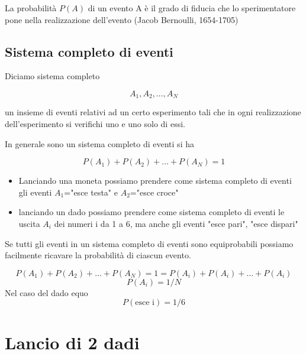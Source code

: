 \documentclass[onecolumn,12pt]{book}\usepackage[]{graphicx}\usepackage[]{color}
\begin{document}
 

La probabilità $P(A)$ di un evento A è il grado di fiducia  che lo sperimentatore pone nella realizzazione dell'evento (Jacob Bernoulli, 1654-1705) 

 
\subsection{Sistema completo di eventi}

Diciamo sistema completo

$$A_1, A_2,\ldots, A_N$$

un insieme di eventi relativi ad un certo esperimento tali che in ogni realizzazione dell'esperimento si verifichi uno e uno solo di essi. 

In generale sono un sistema completo di eventi si ha 

$$P(A_1)+P(A_2)+\ldots+ P(A_N) =1$$

\begin{itemize}
\item Lanciando una moneta possiamo prendere come sistema completo di eventi gli eventi $A_1$="esce testa" e $A_2$="esce croce" 
\item lanciando un dado   possiamo prendere come sistema completo di eventi le uscita $A_i$ dei numeri i da 1 a 6, ma anche gli eventi "esce pari", "esce dispari"
\end{itemize}
Se tutti gli eventi in un sistema completo di eventi sono equiprobabili possiamo facilmente ricavare la probabilità di ciascun evento.
 
$$P(A_1)+P(A_2)+\ldots+ P(A_N) =1=P(A_i)+P(A_i)+\ldots+ P(A_i)$$
$$P(A_i)=1/N$$
Nel caso del dado equo
$$P(\textrm{esce i}) = 1/6$$

\section{Lancio di 2 dadi}
\end{document}
